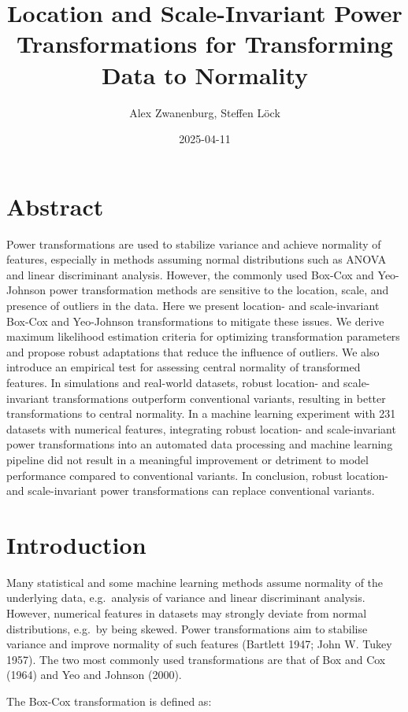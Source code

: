 \documentclass[
  a4paper,
]{article}
\title{Location and Scale-Invariant Power Transformations for
Transforming Data to Normality}
\author{Alex Zwanenburg, Steffen Löck}
\date{2025-04-11}
\begin{document}
\maketitle

\section{Abstract}\label{abstract}

Power transformations are used to stabilize variance and achieve
normality of features, especially in methods assuming normal
distributions such as ANOVA and linear discriminant analysis. However,
the commonly used Box-Cox and Yeo-Johnson power transformation methods
are sensitive to the location, scale, and presence of outliers in the
data. Here we present location- and scale-invariant Box-Cox and
Yeo-Johnson transformations to mitigate these issues. We derive maximum
likelihood estimation criteria for optimizing transformation parameters
and propose robust adaptations that reduce the influence of outliers. We
also introduce an empirical test for assessing central normality of
transformed features. In simulations and real-world datasets, robust
location- and scale-invariant transformations outperform conventional
variants, resulting in better transformations to central normality. In a
machine learning experiment with 231 datasets with numerical features,
integrating robust location- and scale-invariant power transformations
into an automated data processing and machine learning pipeline did not
result in a meaningful improvement or detriment to model performance
compared to conventional variants. In conclusion, robust location- and
scale-invariant power transformations can replace conventional variants.

\section{Introduction}\label{introduction}

Many statistical and some machine learning methods assume normality of
the underlying data, e.g.~analysis of variance and linear discriminant
analysis. However, numerical features in datasets may strongly deviate
from normal distributions, e.g.~by being skewed. Power transformations
aim to stabilise variance and improve normality of such features
(Bartlett 1947; John W. Tukey 1957). The two most commonly used
transformations are that of Box and Cox (1964) and Yeo and Johnson
(2000).

The Box-Cox transformation is defined as:
\end{document}
